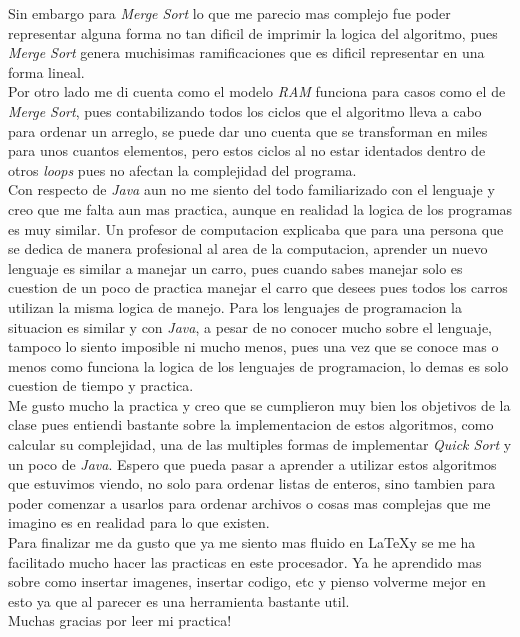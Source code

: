 \documentclass{article}
\begin{document}
	Sin embargo para \emph{Merge Sort} lo que me parecio mas complejo fue poder representar alguna forma no tan dificil de imprimir la logica del algoritmo, pues \emph{Merge Sort} genera muchisimas ramificaciones que es dificil representar en una forma lineal.\\
	
	Por otro lado me di cuenta como el modelo \emph{RAM} funciona para casos como el de \emph{Merge Sort}, pues contabilizando todos los ciclos que el algoritmo lleva a cabo para ordenar un arreglo, se puede dar uno cuenta que se transforman en miles para unos cuantos elementos, pero estos ciclos al no estar identados dentro de otros \emph{loops} pues no afectan la complejidad del programa.\\
	
	Con respecto de \emph{Java} aun no me siento del todo familiarizado con el lenguaje y creo que me falta aun mas practica, aunque en realidad la logica de los programas es muy similar. Un profesor de computacion explicaba que para una persona que se dedica de manera profesional al area de la computacion, aprender un nuevo lenguaje es similar a manejar un carro, pues cuando sabes manejar solo es cuestion de un poco de practica manejar el carro que desees pues todos los carros utilizan la misma logica de manejo. Para los lenguajes de programacion la situacion es similar y con \emph{Java}, a pesar de no conocer mucho sobre el lenguaje, tampoco lo siento imposible ni mucho menos, pues una vez que se conoce mas o menos como funciona la logica de los lenguajes de programacion, lo demas es solo cuestion de tiempo y practica.\\
	
	Me gusto mucho la practica y creo que se cumplieron muy bien los objetivos de la clase pues entiendi bastante sobre la implementacion de estos algoritmos, como calcular su complejidad, una de las multiples formas de implementar \emph{Quick Sort} y un poco de \emph{Java}. Espero que pueda pasar a aprender a utilizar estos algoritmos que estuvimos viendo, no solo para ordenar listas de enteros, sino tambien para poder comenzar a usarlos para ordenar archivos o cosas mas complejas que me imagino es en realidad para lo que existen.\\
	
	Para finalizar me da gusto que ya me siento mas fluido en \LaTeX y se me ha facilitado mucho hacer las practicas en este procesador. Ya he aprendido mas sobre como insertar imagenes, insertar codigo, etc y pienso volverme mejor en esto ya que al parecer es una herramienta bastante util.\\
	
	Muchas gracias por leer mi practica!  
	  
	
	
\end{document}
